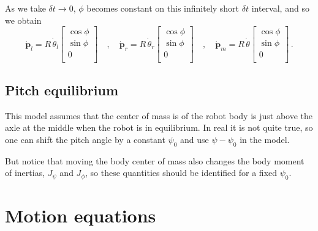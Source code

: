 \documentclass[a4paper]{article}
\renewcommand{\vec}[1]{\mathbf{#1}} %
\newcommand{\vp}{\vec{p}}
\newcommand{\pitch}{\psi}
\newcommand{\yaw}{\phi}
\newcommand{\roll}{\theta}
\begin{document}
As we take $\delta t \rightarrow 0$, $\yaw$ becomes constant on
this infinitely short $\delta t$ interval, and so we obtain
\begin{equation}
    \dot{\vp}_l = R \, \dot\roll_l \left[ \begin{array}{c}
                                    \cos\yaw \\
                                    \sin\yaw \\
                                    0 \\
                                   \end{array} \right]
    \quad , \quad
    \dot{\vp}_r = R \, \dot\roll_r \left[ \begin{array}{c}
                                    \cos\yaw \\
                                    \sin\yaw \\
                                    0 \\
                                   \end{array} \right]
    \quad , \quad
    \dot{\vp}_m = R \, \dot\roll \left[ \begin{array}{c}
                                    \cos\yaw \\
                                    \sin\yaw \\
                                    0 \\
                                   \end{array} \right]
    \,.
\end{equation}

\subsection{Pitch equilibrium}

This model assumes that the center of mass is of the robot body is just
above the axle at the middle when the robot is in equilibrium. In real it
is not quite true, so one can shift the pitch angle by a constant $\pitch_0$
and use $\pitch - \pitch_0$ in the model.

But notice that moving the body center of mass also changes the body moment of 
inertias, $J_\pitch$ and $J_\yaw$, so these quantities should be identified 
for a fixed $\pitch_0$.

\section{Motion equations}
\end{document}
